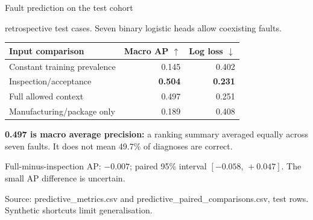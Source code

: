 \documentclass[aspectratio=169,11pt]{beamer}
\newcommand{\source}[1]{\vfill{\fontsize{6.6}{8}\selectfont\color{Muted}Source: #1\par}}
\newcommand{\smalltext}[1]{{\fontsize{9}{11.4}\selectfont #1\par}}
\begin{document}
\begin{frame}[t]{Fault prediction on the test cohort}
  \smalltext{137 retrospective test cases. Seven binary logistic heads allow coexisting faults.}
  \vspace{2mm}
  {\small\begin{tabularx}{\textwidth}{@{}Yrr@{}}
    \toprule
    \textbf{Input comparison} & \textbf{Macro AP $\uparrow$} & \textbf{Log loss $\downarrow$} \\
    \midrule
    Constant training prevalence & 0.145 & 0.402 \\
    Inspection/acceptance & \textbf{0.504} & \textbf{0.231} \\
    Full allowed context & 0.497 & 0.251 \\
    Manufacturing/package only & 0.189 & 0.408 \\
    \bottomrule
  \end{tabularx}}\par
  \vspace{3mm}
  \smalltext{\textbf{0.497 is macro average precision:} a ranking summary averaged
    equally across seven faults. It does not mean 49.7\% of diagnoses are correct.}
  \vspace{2mm}
  \smalltext{Full-minus-inspection AP: $-0.007$; paired 95\% interval
    $[-0.058,\,+0.047]$. The small AP difference is uncertain.}
  \source{predictive\_metrics.csv and predictive\_paired\_comparisons.csv, test rows. Synthetic shortcuts limit generalisation.}
  \note{\SlideFourNotes}
\end{frame}
\end{document}
